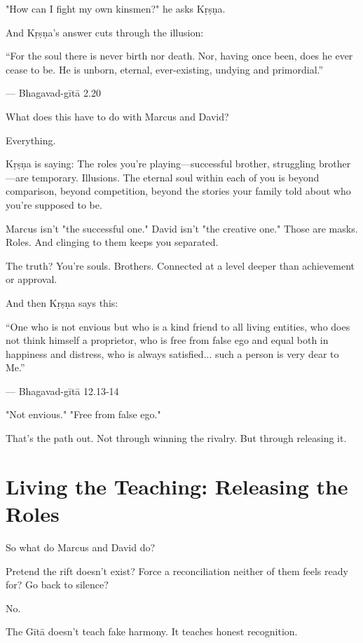 \documentclass[11pt,twoside]{book}
\begin{document}
"How can I fight my own kinsmen?" he asks Kṛṣṇa.

And Kṛṣṇa's answer cuts through the illusion:

\begin{pullquote}
``For the soul there is never birth nor death. Nor, having once been, does he ever cease to be. He is unborn, eternal, ever-existing, undying and primordial.''

--- Bhagavad-gītā 2.20
\end{pullquote}

What does this have to do with Marcus and David?

Everything.

Kṛṣṇa is saying: The roles you're playing—successful brother, struggling brother—are temporary. Illusions. The eternal soul within each of you is beyond comparison, beyond competition, beyond the stories your family told about who you're supposed to be.

Marcus isn't "the successful one." David isn't "the creative one." Those are masks. Roles. And clinging to them keeps you separated.

The truth? You're souls. Brothers. Connected at a level deeper than achievement or approval.

And then Kṛṣṇa says this:

\begin{pullquote}
``One who is not envious but who is a kind friend to all living entities, who does not think himself a proprietor, who is free from false ego and equal both in happiness and distress, who is always satisfied... such a person is very dear to Me.''

--- Bhagavad-gītā 12.13-14
\end{pullquote}

"Not envious." "Free from false ego."

That's the path out. Not through winning the rivalry. But through releasing it.

\section*{Living the Teaching: Releasing the Roles}

So what do Marcus and David do?

Pretend the rift doesn't exist? Force a reconciliation neither of them feels ready for? Go back to silence?

No.

The Gītā doesn't teach fake harmony. It teaches honest recognition.
\end{document}
